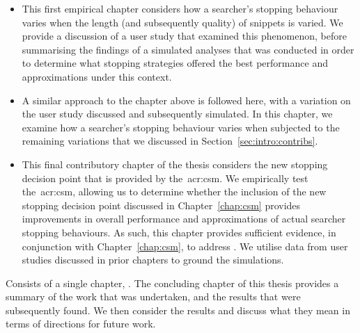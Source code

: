 \begin{itemize}
    \item[]{ This first empirical chapter considers how a searcher's stopping behaviour varies when the length (and subsequently quality) of snippets is varied. We provide a discussion of a user study that examined this phenomenon, before summarising the findings of a simulated analyses that was conducted in order to determine what stopping strategies offered the best performance and approximations under this context.}
    
    \item[]{ A similar approach to the chapter above is followed here, with a variation on the user study discussed and subsequently simulated. In this chapter, we examine how a searcher's stopping behaviour varies when subjected to the remaining variations that we discussed in Section~\ref{sec:intro:contribs}.}
    
    \item[]{ This final contributory chapter of the thesis considers the new stopping decision point that is provided by the~\gls{acr:csm}. We empirically test the~\gls{acr:csm}, allowing us to determine whether the inclusion of the new stopping decision point discussed in Chapter~\ref{chap:csm} provides improvements in overall performance and approximations of actual searcher stopping behaviours. As such, this chapter provides sufficient evidence, in conjunction with Chapter~\ref{chap:csm}, to address . We utilise data from user studies discussed in prior chapters to ground the simulations.}
\end{itemize}

\noindent
{} Consists of a single chapter, . The concluding chapter of this thesis provides a summary of the work that was undertaken, and the results that were subsequently found. We then consider the results and discuss what they mean in terms of directions for future work.





